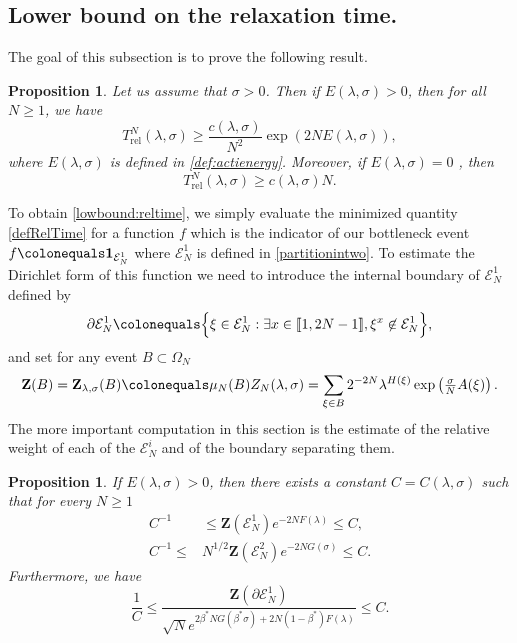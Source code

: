 \documentclass[reqno,11pt]{amsart}
\numberwithin{equation}{section}
\newcommand{\gb}{\beta}
\newcommand{\gO}{\Omega}
\newcommand{\gl}{\lambda}
\newcommand{\gs}{\sigma}
\newcommand{\cE}{{\ensuremath{\mathcal E}} }
\newcommand{\bZ}{{\ensuremath{\mathbf Z}} }
\newcommand{\ind}{\mathbf{1}}
\newcommand{\lint}{\llbracket}
\newcommand{\rint}{\rrbracket}
\newtheorem{proposition}[theorem]{Proposition}
\newcommand{\Rel}{\mathrm{rel}}
\begin{document}
\subsection{Lower bound on the relaxation time.} The goal of this subsection is to prove  the following result.
\begin{proposition}\label{th:lowbdRel}
Let us assume that $\sigma>0$. Then
if $E(\gl,\sigma)>0$, then  for all $N \geq 1$, we have
\begin{equation}\label{lowbound:reltime}
T_{\Rel}^N(\gl, \gs)\geq \frac{c(\gl,\gs)}{N^2} \exp(2N E(\gl,\gs)),
\end{equation}
where $E(\gl,\gs)$ is defined in \eqref{def:actienergy}.
Moreover, if $E(\gl,\gs)=0$ , then
\begin{equation}\label{nobottlenecklb:reltime}
T_{\Rel}^N(\gl, \gs) \geq c(\gl,\gs) N.
\end{equation}

\end{proposition}



To obtain \eqref{lowbound:reltime},
we simply evaluate the minimized quantity  \eqref{defRelTime} for a function $f$ 
which is the indicator of our bottleneck event $f\colonequals \ind_{\mathcal{E}_N^1}$
  where  $\mathcal{E}_N^1$ is defined in \eqref{partitionintwo}.
To estimate the Dirichlet form of this function we need to introduce the internal boundary of $\cE^1_N$ defined by
\begin{equation}\label{boundaryset}
 \partial \mathcal{E}_N^1 \colonequals \Big\{\xi \in \mathcal{E}_N^1: \exists x\in \lint 1, 2N-1 \rint, \xi^x \not\in \mathcal{E}_N^1 \Big\},
\end{equation}
 and set for any event $B\subset \gO_N$
\begin{equation}
\mathbf{Z}(B) = \mathbf{Z}_{\gl,\sigma}(B) \colonequals \mu_N(B) Z_N(\gl,\sigma)=\sum_{\xi \in B} 2^{-2N}\lambda^{H(\xi)}\exp\left(\tfrac{\sigma}{N}A(\xi)\right).
\end{equation}
The more important computation in this section is the estimate of the 
relative weight of each of the $\cE^i_N$ and of the boundary separating them.
\begin{proposition}\label{estimates}
If $E(\gl,\sigma)>0$, then there exists a constant $C=C(\gl,\sigma)$ such that for every $N\ge 1$
\begin{equation}\begin{split}
 C^{-1} &\le \mathbf{Z}\left(\mathcal{E}_N^1\right) e^{-2N F(\gl)}  \le C,\\
  C^{-1}\le &  N^{1/2}\mathbf{Z}\left(\mathcal{E}_N^2\right)  e^{-2N G(\sigma)} \le  C.
\end{split}
\end{equation}
Furthermore, we have
\begin{equation}\label{partfunbdset}
\frac{1}{C } \le \frac{ \bZ \left(\partial \mathcal{E}_N^1 \right)}{ \sqrt{N}e^{ 2\gb^*N G(\gb^* \gs)+2N(1-\gb^*) F(\gl)}} \leq C .
\end{equation}

\end{proposition}
\end{document}
